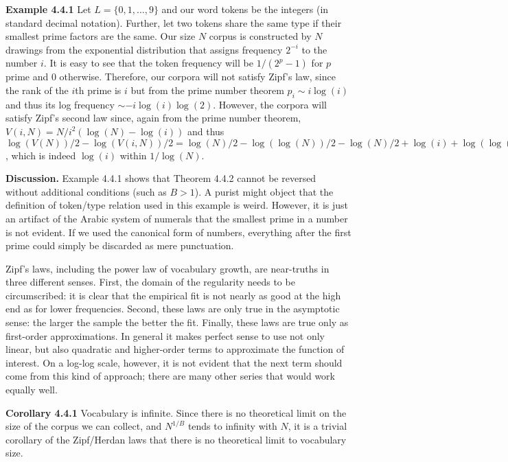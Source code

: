 \smallskip
\noindent
{\bf Example 4.4.1} Let $L=\{0,1,\ldots,9\}$ and our word tokens be the
integers (in standard decimal notation). Further, let two tokens share the
same type if their smallest prime factors are the same. Our size $N$ corpus is
constructed by $N$ drawings from the exponential distribution that assigns
frequency $2^{-i}$ to the number $i$. It is easy to see that the token
frequency will be $1/(2^p - 1)$ for $p$ prime and 0 otherwise. Therefore, our
corpora will not satisfy Zipf's law, since the rank of the $i$th prime is $i$
but from the prime number theorem $p_i \sim i\log(i)$ and thus its log
frequency $\sim -i\log(i)\log(2)$. However, the corpora will satisfy Zipf's
second law since, again from the prime number theorem, $V(i,N)=N/i^2(\log(N)
-\log(i))$ and thus $\log(V(N))/2 -\log(V(i,N))/2 = \log(N)/2 -\log(\log(N))/2
-\log(N)/2 +\log(i) +\log(\log(N)-\log(i))/2$, which is indeed $\log(i)$
within $1/\log(N)$.

\smallskip
\noindent
{\bf Discussion.} Example 4.4.1 shows that Theorem 4.4.2 cannot be reversed
without additional conditions (such as $B>1$). A purist might object that the
definition of token/type relation used in this example is weird. However, it
is just an artifact of the Arabic system of numerals that the smallest prime
in a number is not evident. If we used the canonical form of numbers,
everything after the first prime could simply be discarded as mere
punctuation. 

\smallskip
\noindent
Zipf's laws, including the power law of vocabulary growth, are near-truths in
three different senses. First, the domain of the regularity needs to be
circumscribed: it is clear that the empirical fit is not nearly as good at the
high end as for lower frequencies.  Second, these laws are only true in the
asymptotic sense: the larger the sample the better the fit. Finally, these
laws are true only as first-order approximations. In general it makes perfect
sense to use not only linear, but also quadratic and higher-order terms to
approximate the function of interest. On a log-log scale, however, it is not
evident that the next term should come from this kind of approach; there are
many other series that would work equally well.

\smallskip
\noindent
{\bf Corollary 4.4.1} Vocabulary is infinite. Since there is no theoretical
limit on the size of the corpus we can collect, and $N^{1/B}$ tends to
infinity with $N$, it is a trivial corollary of the Zipf/Herdan laws that 
there is no theoretical limit to vocabulary size.

